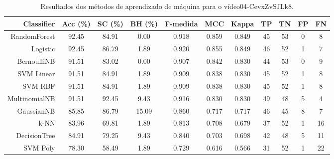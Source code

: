 \begin{table}[!htb]
\centering
\caption{Resultados dos métodos de aprendizado de máquina para o vídeo04-CevxZvSJLk8.}
\label{tab:04-CevxZvSJLk8}
\begin{tabular}{r|c|c|c|c|c|c|c|c|c|c}
\hline\hline
Classifier & Acc (\%) & SC (\%) & BH (\%) & F-medida & MCC & Kappa & TP & TN & FP & FN \\ \hline
RandomForest & 92.45 & 84.91 & 0.00 & 0.918 & 0.859 & 0.849 & 45 & 53 & 0 & 8 \\ 
Logistic & 92.45 & 86.79 & 1.89 & 0.920 & 0.855 & 0.849 & 46 & 52 & 1 & 7 \\ 
BernoulliNB & 91.51 & 83.02 & 0.00 & 0.907 & 0.842 & 0.830 & 44 & 53 & 0 & 9 \\ 
SVM Linear & 91.51 & 84.91 & 1.89 & 0.909 & 0.838 & 0.830 & 45 & 52 & 1 & 8 \\ 
SVM RBF & 91.51 & 84.91 & 1.89 & 0.909 & 0.838 & 0.830 & 45 & 52 & 1 & 8 \\ 
MultinomialNB & 91.51 & 92.45 & 9.43 & 0.916 & 0.830 & 0.830 & 49 & 48 & 5 & 4 \\ 
GaussianNB & 85.85 & 86.79 & 15.09 & 0.860 & 0.717 & 0.717 & 46 & 45 & 8 & 7 \\ 
k-NN & 83.96 & 69.81 & 1.89 & 0.813 & 0.708 & 0.679 & 37 & 52 & 1 & 16 \\ 
DecisionTree & 84.91 & 79.25 & 9.43 & 0.840 & 0.703 & 0.698 & 42 & 48 & 5 & 11 \\ 
SVM Poly & 78.30 & 58.49 & 1.89 & 0.729 & 0.616 & 0.566 & 31 & 52 & 1 & 22 \\ 
\hline\hline
\end{tabular}
\end{table}

